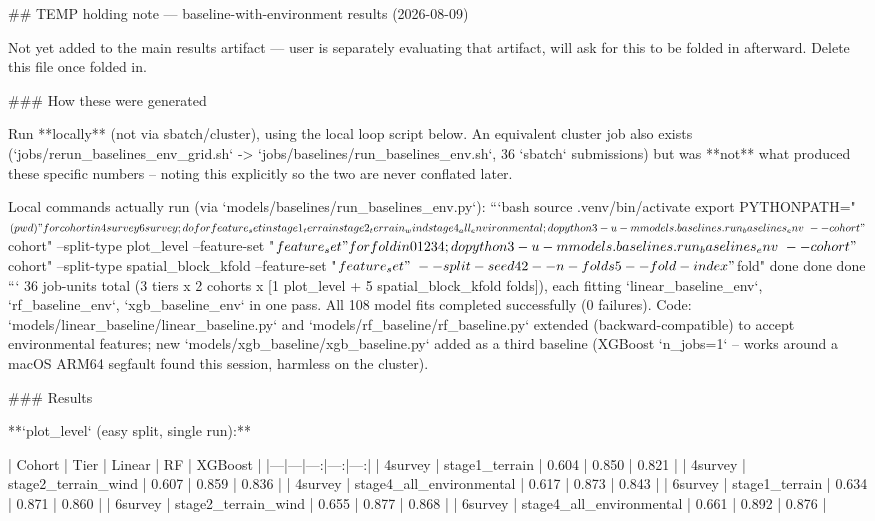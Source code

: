 ## TEMP holding note — baseline-with-environment results (2026-08-09)

Not yet added to the main results artifact — user is separately evaluating that artifact,
will ask for this to be folded in afterward. Delete this file once folded in.

### How these were generated

Run **locally** (not via sbatch/cluster), using the local loop script below. An equivalent
cluster job also exists (`jobs/rerun_baselines_env_grid.sh` -> `jobs/baselines/run_baselines_env.sh`,
36 `sbatch` submissions) but was **not** what produced these specific numbers -- noting this
explicitly so the two are never conflated later.

Local commands actually run (via `models/baselines/run_baselines_env.py`):
```bash
source .venv/bin/activate
export PYTHONPATH="$(pwd)"

for cohort in 4survey 6survey; do
  for feature_set in stage1_terrain stage2_terrain_wind stage4_all_environmental; do
    python3 -u -m models.baselines.run_baselines_env \
      --cohort "$cohort" --split-type plot_level --feature-set "$feature_set"

    for fold in 0 1 2 3 4; do
      python3 -u -m models.baselines.run_baselines_env \
        --cohort "$cohort" --split-type spatial_block_kfold --feature-set "$feature_set" \
        --split-seed 42 --n-folds 5 --fold-index "$fold"
    done
  done
done
```
36 job-units total (3 tiers x 2 cohorts x [1 plot_level + 5 spatial_block_kfold folds]), each
fitting `linear_baseline_env`, `rf_baseline_env`, `xgb_baseline_env` in one pass. All 108 model
fits completed successfully (0 failures). Code: `models/linear_baseline/linear_baseline.py` and
`models/rf_baseline/rf_baseline.py` extended (backward-compatible) to accept environmental
features; new `models/xgb_baseline/xgb_baseline.py` added as a third baseline (XGBoost
`n_jobs=1` -- works around a macOS ARM64 segfault found this session, harmless on the cluster).

### Results

**`plot_level` (easy split, single run):**

| Cohort | Tier | Linear | RF | XGBoost |
|---|---|---:|---:|---:|
| 4survey | stage1_terrain | 0.604 | 0.850 | 0.821 |
| 4survey | stage2_terrain_wind | 0.607 | 0.859 | 0.836 |
| 4survey | stage4_all_environmental | 0.617 | 0.873 | 0.843 |
| 6survey | stage1_terrain | 0.634 | 0.871 | 0.860 |
| 6survey | stage2_terrain_wind | 0.655 | 0.877 | 0.868 |
| 6survey | stage4_all_environmental | 0.661 | 0.892 | 0.876 |

